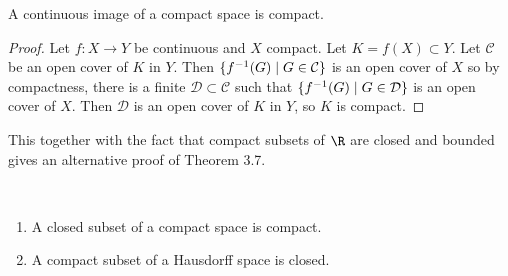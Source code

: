 \begin{theorem}              %
A continuous image of a compact space is compact.
\end{theorem}

\begin{proof}                         %
Let $f: X \to Y$ be continuous and $X$ compact. Let $K=f(X)\subset Y$. Let $\mathcal{C}$ be an open cover of $K$ in $Y$. Then $\{f^{-1} (G)\mid G\in \mathcal{C}\}$ is an open cover of $X$ so by compactness, there is a finite $\mathcal{D}\subset\mathcal{C}$ such that $\{f^{-1} (G)\mid G\in \mathcal{D}\}$ is an open cover of $X$. Then $\mathcal{D}$ is an open cover of $K$ in $Y$, so $K$ is compact.
\end{proof}

\begin{remark}
This together with the fact that compact subsets of $\R$ are closed and bounded gives an alternative proof of Theorem 3.7.
\end{remark}

\begin{lemma} \label{lem:35} ~
    \begin{enumerate}
        \item A closed subset of a compact space is compact.
        \item A compact subset of a Hausdorff space is closed.
    \end{enumerate}
\end{lemma}  

